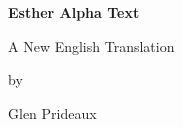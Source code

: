 \begin{titlepage}
\thispagestyle{empty}

\vspace*{\fill}

\begin{center}

{\Huge\bfseries Esther Alpha Text\par}

\vspace{1.5em}

{\Large
A New English Translation\par}

\vspace{3em}

{\large by\par}

\vspace{0.5em}

{\Large Glen Prideaux\par}

\end{center}

\vspace*{\fill}

\end{titlepage}